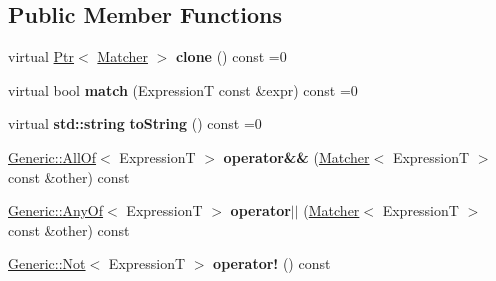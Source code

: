 \subsection*{Public Member Functions}
\begin{DoxyCompactItemize}
\item 
\mbox{\label{struct_catch_1_1_matchers_1_1_impl_1_1_matcher_a9d31e5018fea24efa08c3cbf5aa4475d}} 
virtual \hyperlink{class_catch_1_1_ptr}{Ptr}$<$ \hyperlink{struct_catch_1_1_matchers_1_1_impl_1_1_matcher}{Matcher} $>$ {\bfseries clone} () const =0
\item 
\mbox{\label{struct_catch_1_1_matchers_1_1_impl_1_1_matcher_a8c1c5511ce1f3738a45e6901b558f583}} 
virtual bool {\bfseries match} (ExpressionT const \&expr) const =0
\item 
\mbox{\label{struct_catch_1_1_matchers_1_1_impl_1_1_matcher_a091bcc37e589967d7e10fc7790d820e2}} 
virtual \textbf{ std\+::string} {\bfseries to\+String} () const =0
\item 
\mbox{\label{struct_catch_1_1_matchers_1_1_impl_1_1_matcher_adb060f348e3ed404b80209fbc62174e1}} 
\hyperlink{class_catch_1_1_matchers_1_1_impl_1_1_generic_1_1_all_of}{Generic\+::\+All\+Of}$<$ ExpressionT $>$ {\bfseries operator\&\&} (\hyperlink{struct_catch_1_1_matchers_1_1_impl_1_1_matcher}{Matcher}$<$ ExpressionT $>$ const \&other) const
\item 
\mbox{\label{struct_catch_1_1_matchers_1_1_impl_1_1_matcher_a55b1e12315e7a5daf7ce7a11ddfaa295}} 
\hyperlink{class_catch_1_1_matchers_1_1_impl_1_1_generic_1_1_any_of}{Generic\+::\+Any\+Of}$<$ ExpressionT $>$ {\bfseries operator$\vert$$\vert$} (\hyperlink{struct_catch_1_1_matchers_1_1_impl_1_1_matcher}{Matcher}$<$ ExpressionT $>$ const \&other) const
\item 
\mbox{\label{struct_catch_1_1_matchers_1_1_impl_1_1_matcher_a7ecd56842090611c9dbfc325b42fa942}} 
\hyperlink{class_catch_1_1_matchers_1_1_impl_1_1_generic_1_1_not}{Generic\+::\+Not}$<$ ExpressionT $>$ {\bfseries operator!} () const
\end{DoxyCompactItemize}
